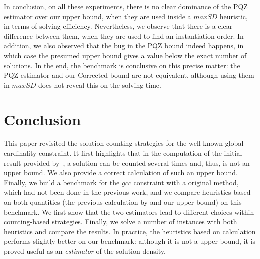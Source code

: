\documentclass[jair,twoside,11pt,theapa]{article}
\begin{document}
%       
%       
  
  

In conclusion, on all these experiments, there is no clear dominance of the PQZ estimator over our upper bound, when they are used inside a $maxSD$ heuristic, in terms of solving efficiency. Nevertheless, we observe that there is a clear difference between them, when they are used to find an instantiation order. In addition, we also observed that the bug in the PQZ bound indeed happens, in which case the presumed upper bound gives a value below the exact number of solutions. In the end, the benchmark is conclusive on this precise matter: the PQZ estimator and our Corrected bound are not equivalent, although using them in $maxSD$ does not reveal this on the solving time.



\section{Conclusion}
This paper revisited the solution-counting strategies for the well-known global cardinality constraint. It first highlights that in the computation of the initial result provided by~\cite{PesantQZ12}, a solution can be counted several times and, thus, is not an upper bound. We also provide a correct calculation of such an upper bound. Finally, we build a benchmark for the $gcc$ constraint with a original method, which had not been done in the previous work, and we compare heuristics based on both quantities (the previous calculation by \cite{PesantQZ12} and our upper bound) on this benchmark. We first show that the two estimators lead to different choices within counting-based strategies. Finally, we solve a number of instances with both heuristics and compare the results. In practice, the heuristics based on \cite{PesantQZ12} calculation performs slightly better on our benchmark: although it is not a upper bound, it is proved useful as an \textit{estimator} of the solution density.
\end{document}
